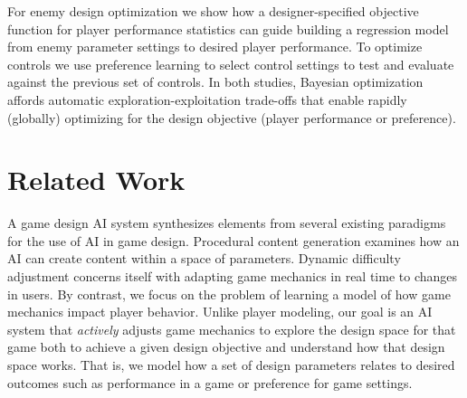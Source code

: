 \documentclass{sig-alternate}
\begin{document}
\noindent
For enemy design optimization we show how a designer-specified objective function for player performance statistics can guide building a regression model from enemy parameter settings to desired player performance. To optimize controls we use preference learning to select control settings to test and evaluate against the previous set of controls. 
In both studies, Bayesian optimization affords automatic exploration-exploitation trade-offs that enable rapidly (globally) optimizing for the design objective (player performance or preference).




\section{Related Work}

A game design AI system synthesizes elements from several existing paradigms for the use of AI in game design. Procedural content generation examines how an AI can create content within a space of parameters.  Dynamic difficulty adjustment concerns itself with adapting game mechanics in real time to changes in users. By contrast, we focus on the problem of learning a model of how game mechanics impact player behavior. 
Unlike player modeling, our goal is an AI system that {\em actively} adjusts game mechanics to explore the design space for that game both to achieve a given design objective and understand how that design space works. That is, we model how a set of design parameters relates to desired outcomes such as performance in a game or preference for game settings.
\end{document}
